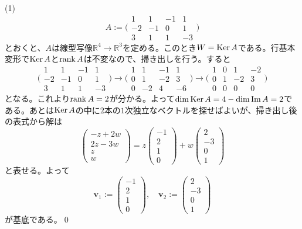 \noindent (1)
\[
A := 
\Biggl(
\begin{array}{rrrr}
1 & 1 & -1 & 1 \\
-2 & -1 & 0 & 1 \\
3 & 1 & 1 & -3
\end{array}
\Biggr)
\]
とおくと、$A$は線型写像$\mathbb{R}^4\rightarrow\mathbb{R}^3$を定める。このとき$W = \operatorname{Ker} A$である。行基本変形で$\operatorname{Ker} A$と$\operatorname{rank} A$は不変なので、掃き出しを行う。すると
\[
\Biggl(
\begin{array}{rrrr}
1 & 1 & -1 & 1 \\
-2 & -1 & 0 & 1 \\
3 & 1 & 1 & -3
\end{array}
\Biggr)
\xrightarrow[]{}
\Biggl(
\begin{array}{rrrr}
1 & 1 & -1 & 1 \\
0 & 1 & -2 & 3 \\
0 & -2 & 4 & -6
\end{array}
\Biggr)
\xrightarrow[]{}
\Biggl(
\begin{array}{rrrr}
1 & 0 & 1 & -2 \\
0 & 1 & -2 & 3 \\
0 & 0 & 0 & 0
\end{array}
\Biggr)
\]
となる。これより$\operatorname{rank} A = 2$が分かる。よって$\dim \operatorname{Ker} A = 4 - \dim \mathrm{Im}\, A = 2$である。あとは$\operatorname{Ker} A$の中に$2$本の$1$次独立なベクトルを探せばよいが、掃き出し後の表式から解は
\[
\begin{pmatrix}
-z + 2w \\
2z - 3w \\
z \\
w
\end{pmatrix}
=
z
\begin{pmatrix}
-1 \\
2 \\
1 \\
0
\end{pmatrix}
+
w
\begin{pmatrix}
2 \\
-3 \\
0 \\
1
\end{pmatrix}
\]
と表せる。よって
\[
\bm{v}_1 :=
\begin{pmatrix}
-1 \\
2 \\
1 \\
0
\end{pmatrix}, \quad
\bm{v}_2 :=
\begin{pmatrix}
2 \\
-3 \\
0 \\
1
\end{pmatrix}
\]
が基底である。\qed

